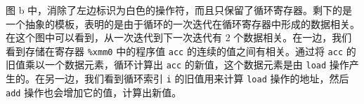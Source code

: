 图 b 中，消除了左边标识为白色的操作符，而且只保留了循环寄存器。剩下的是一个抽象的模板，表明的是由于循环的一次迭代在循环寄存器中形成的数据相关。在这个图中可以看到，从一次迭代到下一次迭代有 2 个数据相关。在一边，我们看到存储在寄存器 \verb|%xmm0| 中的程序值 \verb|acc| 的连续的值之间有相关。通过将 \verb|acc| 的旧值乘以一个数据元素，循环计算出 \verb|acc| 的新值，这个数据元素是由 \verb|load| 操作产生的。在另一边，我们看到循环索引 \verb|i| 的旧值用来计算 \verb|load| 操作的地址，然后 \verb|add| 操作也会增加它的值，计算出新值。

